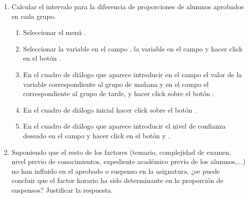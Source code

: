 \begin{enumerate}[leftmargin=*]
\begin{enumerate}
\item Calcular el intervalo para la diferencia de proporciones de alumnos aprobados en cada grupo.
\begin{indicacion}
\begin{enumerate}
\item Seleccionar el menú .
\item Seleccionar la variable  en el campo , la variable  en el 
campo  y hacer click en el botón .
\item En el cuadro de diálogo que aparece introducir en el campo  el valor de la variable
 correspondiente al grupo de mañana y en el campo  el correspondiente al grupo de tarde,
y hacer click sobre el botón .
\item En el cuadro de diálogo inicial hacer click sobre el botón .
\item En el cuadro de diálogo que aparece introducir el nivel de confianza deseado en el campo  y hacer click en el botón  y .
\end{enumerate}
\end{indicacion}

\item Suponiendo que el resto de los factores (temario, complejidad de examen, nivel previo de conocimientos, expediente
académico previo de los alumnos,...) no han influido en el aprobado o suspenso en la asignatura, ¿se puede concluir que
el factor horario ha sido determinante en la proporción de suspensos? Justificar la respuesta.
\end{enumerate}
\end{enumerate}


